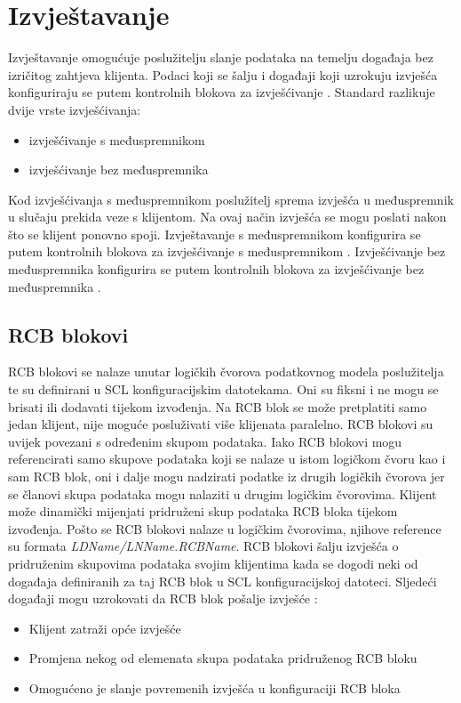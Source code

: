 \documentclass[times, utf8, zavrsni]{fer}
\begin{document}
\section{Izvještavanje}
Izvještavanje omogućuje poslužitelju slanje podataka na temelju događaja bez izričitog zahtjeva klijenta. Podaci koji se šalju i događaji koji uzrokuju izvješća konfiguriraju se putem kontrolnih blokova za izvješćivanje . Standard razlikuje dvije vrste izvješćivanja:
\begin{itemize}
    \item izvješćivanje s međuspremnikom
    \item izvješćivanje bez međuspremnika
\end{itemize}
Kod izvješćivanja s međuspremnikom poslužitelj sprema izvješća u međuspremnik u slučaju prekida veze s klijentom. Na ovaj način izvješća se mogu poslati nakon što se klijent ponovno spoji. Izvještavanje s međuspremnikom konfigurira se putem kontrolnih blokova za izvješćivanje s međuspremnikom . Izvješćivanje bez međuspremnika konfigurira se putem kontrolnih blokova za izvješćivanje bez međuspremnika .

\subsection{RCB blokovi}
RCB blokovi se nalaze unutar logičkih čvorova podatkovnog modela poslužitelja te su definirani u SCL konfiguracijskim datotekama. Oni su fiksni i ne mogu se brisati ili dodavati tijekom izvođenja. Na RCB blok se može pretplatiti samo jedan klijent, nije moguće posluživati više klijenata paralelno. RCB blokovi su uvijek povezani s određenim skupom podataka. Iako RCB blokovi mogu referencirati samo skupove podataka koji se nalaze u istom logičkom čvoru kao i sam RCB blok, oni i dalje mogu nadzirati podatke iz drugih logičkih čvorova jer se članovi skupa podataka mogu nalaziti u drugim logičkim čvorovima. Klijent može dinamički mijenjati pridruženi skup podataka RCB bloka tijekom izvođenja. Pošto se RCB blokovi nalaze u logičkim čvorovima, njihove reference su formata \textit{LDName/LNName.RCBName}. RCB blokovi šalju izvješća o pridruženim skupovima podataka svojim klijentima kada se dogodi neki od događaja definiranih za taj RCB blok u SCL konfiguracijskoj datoteci. Sljedeći događaji mogu uzrokovati da RCB blok pošalje izvješće \citep{beanit:data-sets}:
\begin{itemize}
    \item Klijent zatraži opće izvješće 
    \item Promjena nekog od elemenata skupa podataka pridruženog RCB bloku
    \item Omogućeno je slanje povremenih izvješća u konfiguraciji RCB bloka
\end{itemize}
\end{document}
